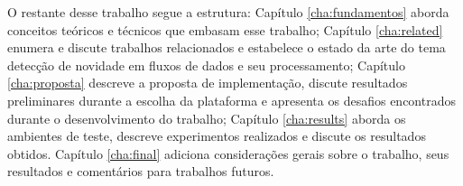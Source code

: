 O restante desse trabalho segue a estrutura:
Capítulo \ref{cha:fundamentos} aborda conceitos teóricos e técnicos que embasam
esse trabalho;
Capítulo \ref{cha:related} enumera e discute trabalhos relacionados e estabelece
o estado da arte do tema detecção de novidade em fluxos de dados e seu
processamento;
Capítulo \ref{cha:proposta} descreve a proposta de implementação, discute
resultados preliminares durante a escolha da plataforma e apresenta os desafios
encontrados durante o desenvolvimento do trabalho;
Capítulo \ref{cha:results} aborda os ambientes de teste, descreve experimentos
realizados e discute os resultados obtidos.
Capítulo \ref{cha:final} adiciona considerações gerais sobre o trabalho, seus
resultados e comentários para trabalhos futuros.

